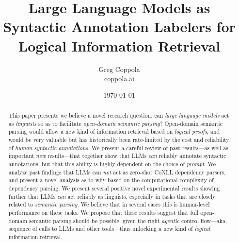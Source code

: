 \documentclass[11pt]{article}
\title{Large Language Models as Syntactic Annotation Labelers for Logical Information Retrieval}
\author{Greg Coppola\\coppola.ai}
\date{\today}
\begin{document}
\maketitle

\begin{abstract}
This paper presents we believe a novel research question: can \emph{large language models} act as \emph{linguists} so as to facilitate \emph{open-domain semantic parsing}?
Open-domain semantic parsing would allow a new kind of information retrieval based on \emph{logical proofs}, and would be very valuable but has historically been rate-limited by the cost and reliability of \emph{human syntactic annotations}.
We present a careful review of past results---as well as important {\em new} results---that together show that LLMs \emph{can} reliably annotate syntactic annotations, but that this ability is highly dependent on the choice of \emph{prompt}.
We analyze past findings that LLMs can \emph{not} act as zero-shot CoNLL dependency parsers, and present a novel analysis as to why based on the computational complexity of dependency parsing.
We present several positive novel experimental results showing further that LLMs \emph{can} act reliably as linguists, especially in tasks that are closely related to \emph{semantic parsing}.
We believe that in several cases this is human-level performance on these tasks.
We propose that these results suggest that full open-domain semantic parsing should be possible, given the right \emph{agentic} control flow---aka. sequence of calls to LLMs and other tools---thus unlocking a new kind of \emph{logical} information retrieval.
\end{abstract}
\end{document}
